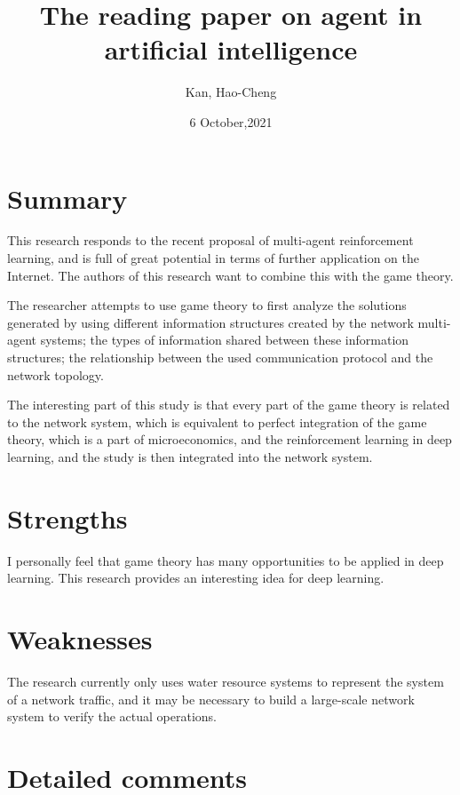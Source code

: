 \documentclass{report} %
\title{\textbf{The reading paper on agent in artificial intelligence}}
\author{Kan, Hao-Cheng}
\date{6 October,2021}
\begin{document}
\maketitle


\section{Summary}

This research responds to the recent proposal of multi-agent reinforcement learning, and is full of great potential in terms of further application on the Internet. The authors of this research want to combine this with the game theory.

The researcher attempts to use game theory to first analyze the solutions generated by using different information structures created by the network multi-agent systems; the types of information shared between these information structures; the relationship between the used communication protocol and the network topology.

The interesting part of this study is that every part of the game theory is related to the network system, which is equivalent to perfect integration of the game theory, which is a part of microeconomics, and the reinforcement learning in deep learning, and the study is then integrated into the network system.

\section{Strengths}

I personally feel that game theory has many opportunities to be applied in deep learning. This research provides an interesting idea for deep learning.
 
\section{Weaknesses}

The research currently only uses water resource systems to represent the system of a network traffic, and it may be necessary to build a large-scale network system to verify the actual operations.

\section{Detailed comments}
\end{document}
